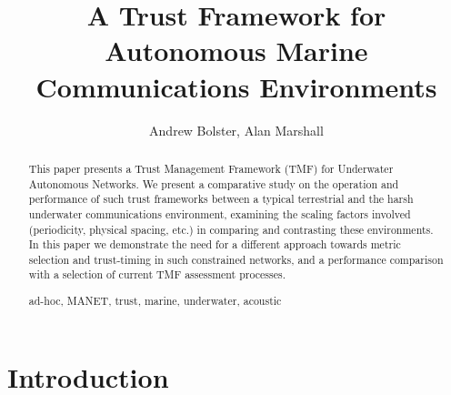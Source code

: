 \documentclass[runningheads,a4paper]{llncs}
\newcommand{\keywords}[1]{\par\addvspace\baselineskip
\noindent\keywordname\enspace\ignorespaces#1}
\begin{document}
\mainmatter  %

\title{A Trust Framework for Autonomous Marine Communications Environments}


%
%
\author{Andrew Bolster, Alan Marshall}
%


\maketitle   

\begin{abstract}
  This paper presents a Trust Management Framework (TMF) for Underwater Autonomous Networks. 
  We present a comparative study on the operation and performance of such trust frameworks between a typical terrestrial and the harsh underwater communications environment, examining the scaling factors involved (periodicity, physical spacing, etc.) in comparing and contrasting these environments. In this paper we demonstrate the need for a different approach towards metric selection and trust-timing in such constrained networks, and a performance comparison with a selection of current TMF assessment processes.
  \keywords{ad-hoc, MANET, trust, marine, underwater, acoustic}
\end{abstract}

\section{Introduction}\label{sec:introduction}
\end{document}
